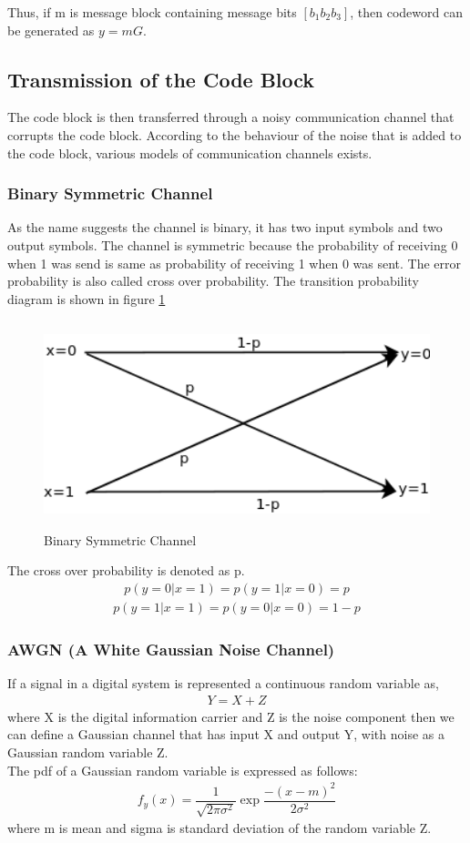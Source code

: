 Thus, if m is message block containing message bits $[b_1 b_2 b_3]$, then codeword can be generated as $y=mG$.

\subsection{Transmission of the Code Block}
The code block is then transferred through a noisy communication channel that corrupts the code block. According to the behaviour of the noise that is added to the code block, various models of communication channels exists. 
\subsubsection{Binary Symmetric Channel}
 As the name suggests the channel is binary, it has two input symbols and two output symbols. The channel is symmetric because the probability of receiving 0 when 1 was send is same as probability of receiving 1 when 0 was sent. The error probability is also called cross over probability. The transition probability diagram is shown in figure \ref{bsc}
 \begin{figure}[h]
\centering
\includegraphics[height=6cm,width=12cm]{bsc}
\caption[Transition probability diagram of Binary Symmetric Channel]{Binary Symmetric Channel}
\label{bsc}
\end{figure}
The cross over probability is denoted as p.
\begin{align} p(y=0|x=1) = p(y=1|x=0) = p  \end{align}
\begin{align} p(y=1|x=1) = p(y=0|x=0) = 1-p  \end{align}
\subsubsection{AWGN (A White Gaussian Noise Channel)}
If a signal in a digital system is represented a continuous random variable as,
\begin{align} Y = X + Z \end{align}
where X is the digital information carrier and Z is the noise component then we can define a Gaussian channel that has input X and output Y, with noise as a Gaussian random variable Z. \\
The pdf of a Gaussian random variable is expressed as follows: \\
\begin{align} f_y(x) = \dfrac{1}{\sqrt{2\pi\sigma^{2}}} \exp{\dfrac{-(x-m)^2}{2\sigma^2}}
 \end{align} 
where m is mean and sigma is standard deviation of the random variable Z.
